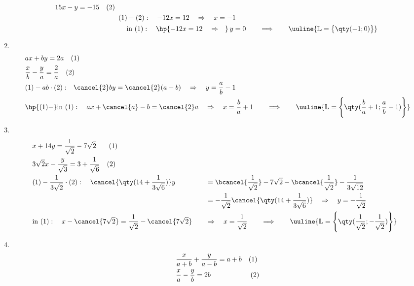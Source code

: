 \begin{enumerate}[label=(\alph*)]
\begin{align*}
\begin{array}{l}
            15x -y = -15 \quad (2)
        \end{array} \\
        &(1) - (2): \quad -12x = 12 \quad \Rightarrow \quad  x = -1\\
        &\quad\,\text{in } (1): \quad \hp{-12x = 12\quad \Rightarrow \quad} \,y = 0 \qquad \Longrightarrow \qquad \uuline{\mathbb{L} = \big\{\qty(-1;0)\big\}}
    \end{align*}
    \item $~$\\[-1.45cm] 
    \begin{align*}
        &ax+by=2a \quad (1)\\
        &\frac{x}{b}-\frac{y}{a}=\frac{2}{a} \quad (2)\\
        &(1) - ab \cdot (2): \;\;\,\cancel{2}by = \cancel{2}(a-b) \quad \Rightarrow \quad y = \frac{a}{b}-1 \\
        &\hp{(1)-}\text{in } (1): \quad ax + \cancel{a} -b = \cancel{2}a \quad \Rightarrow \quad x=\frac{b}{a}+ 1 \qquad \Longrightarrow \qquad \uuline{\mathbb{L} = \Bigg\{\qty(\frac{b}{a}+1;\frac{a}{b}-1)\Bigg\}}
    \end{align*}
    \item $~$\\[-1.45cm] 
    \begin{alignat*}{2}
        &x+14y=\frac{1}{\sqrt{2}}-7\sqrt{2} \;\;\;\quad (1)\\
        &3\sqrt{2}x-\frac{y}{\sqrt{3}}=3+\frac{1}{\sqrt{6}} \quad (2)\\
        &(1) - \frac{1}{3\sqrt{2}}\cdot (2): \quad\cancel{\qty(14+\frac{1}{3\sqrt{6}})}y &&= \bcancel{\frac{1}{\sqrt{2}}} - 7\sqrt{2} - \bcancel{\frac{1}{\sqrt{2}}} - \frac{1}{3\sqrt{12}} \\
        & &&= -\frac{1}{\sqrt{2}} \cancel{\qty(14+\frac{1}{3\sqrt{6}})} \quad \Rightarrow \quad y = -\frac{1}{\sqrt{2}} \\
        & \text{in } (1): \quad x-\cancel{7\sqrt{2}} = \frac{1}{\sqrt{2}} - \cancel{7\sqrt{2}} \quad &&\Rightarrow \quad x = \frac{1}{\sqrt{2}} \qquad \Longrightarrow \qquad \uuline{\mathbb{L} = \Bigg\{\qty(\frac{1}{\sqrt{2}};-\frac{1}{\sqrt{2}})\Bigg\}}
    \end{alignat*}
    \item $~$\\[-1.45cm] 
    \begin{alignat*}{3}
        &\frac{x}{a+b}+\frac{y}{a-b}=a+b \quad (1)\\
        &\frac{x}{a}-\frac{y}{b}=2b \hspace{1.68cm}\quad (2) \\

\end{alignat*}
\end{enumerate}
